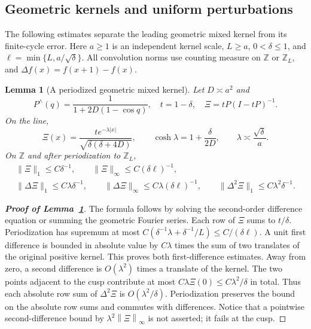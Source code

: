 \documentclass[11pt]{article}
\numberwithin{equation}{section}
\newtheorem{lemma}[theorem]{Lemma}
\theoremstyle{remark}
\newcommand{\Z}{\mathbb Z}
\newcommand{\norm}[1]{\left\|#1\right\|}
\begin{document}
\subsection{Geometric kernels and uniform perturbations}
\label{app:geometric-kernels}
The following estimates separate the leading geometric mixed kernel
from its finite-cycle error. Here $a\ge1$ is an independent kernel
scale, $L\ge a$, $0<\delta\le1$, and
$\ell=\min\{L,a/\sqrt\delta\}$. All convolution norms use counting
measure on $\Z$ or $\Z_L$, and $\Delta f(x)=f(x+1)-f(x)$.

\begin{lemma}[A periodized geometric mixed kernel]\label{uvp:lem:geom}
Let $D\asymp a^2$ and
\[
 P^{\wedge}(q)=\frac1{1+2D(1-\cos q)},\quad t=1-\delta,
 \quad \Xi=tP(I-tP)^{-1}.
\]
On the line,
\[
 \Xi(x)=\frac{t e^{-\lambda|x|}}{\sqrt{\delta(\delta+4D)}},
 \qquad \cosh\lambda=1+\frac{\delta}{2D},
 \qquad \lambda\asymp\frac{\sqrt\delta}{a}.
\]
On $\Z$ and after periodization to $\Z_L$,
\begin{equation}\label{da:eq:geometric-kernel-bounds}
 \begin{gathered}
 \|\Xi\|_1\le C\delta^{-1},\qquad
 \|\Xi\|_\infty\le C(\delta\ell)^{-1},\\
 \|\Delta\Xi\|_1\le C\lambda\delta^{-1},\qquad
 \|\Delta\Xi\|_\infty\le C\lambda(\delta\ell)^{-1},\qquad
 \|\Delta^2\Xi\|_1\le C\lambda^2\delta^{-1}.
 \end{gathered}
\end{equation}
\end{lemma}

\begin{proof}[\textbf{Proof of Lemma~\ref{uvp:lem:geom}}]
The formula follows by solving the second-order difference equation
or summing the geometric Fourier series. Each row of $\Xi$ sums to $t/\delta$.
Periodization has supremum at most
$C(\delta^{-1}\lambda+\delta^{-1}/L)
 \le C/(\delta\ell)$.
A unit first difference is bounded in absolute value by $C\lambda$
times the sum of two translates of the original positive kernel.
This proves both first-difference estimates. Away from zero, a
second difference is $O(\lambda^2)$ times a translate of the kernel.
The two points adjacent to the cusp contribute at most
$C\lambda\Xi(0)\le C\lambda^2/\delta$ in total. Thus each absolute row
sum of $\Delta^2\Xi$ is $O(\lambda^2/\delta)$. Periodization preserves
the bound on the absolute row sums and commutes with differences. Notice that a pointwise
second-difference bound by $\lambda^2\norm\Xi_\infty$ is not asserted;
it fails at the cusp.
\end{proof}
\end{document}
